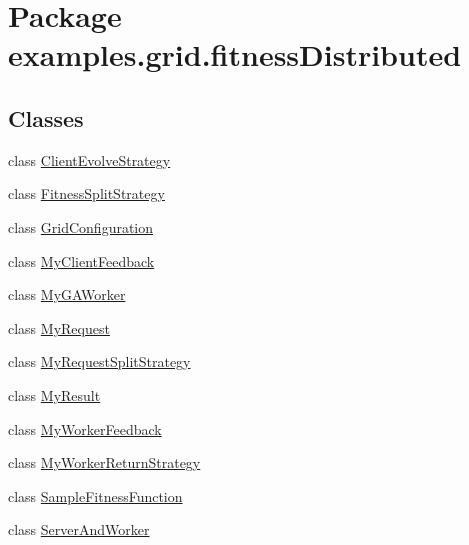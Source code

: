 \hypertarget{namespaceexamples_1_1grid_1_1fitness_distributed}{\section{Package examples.\-grid.\-fitness\-Distributed}
\label{namespaceexamples_1_1grid_1_1fitness_distributed}
}
\subsection*{Classes}
\begin{DoxyCompactItemize}
\item 
class \hyperlink{classexamples_1_1grid_1_1fitness_distributed_1_1_client_evolve_strategy}{Client\-Evolve\-Strategy}
\item 
class \hyperlink{classexamples_1_1grid_1_1fitness_distributed_1_1_fitness_split_strategy}{Fitness\-Split\-Strategy}
\item 
class \hyperlink{classexamples_1_1grid_1_1fitness_distributed_1_1_grid_configuration}{Grid\-Configuration}
\item 
class \hyperlink{classexamples_1_1grid_1_1fitness_distributed_1_1_my_client_feedback}{My\-Client\-Feedback}
\item 
class \hyperlink{classexamples_1_1grid_1_1fitness_distributed_1_1_my_g_a_worker}{My\-G\-A\-Worker}
\item 
class \hyperlink{classexamples_1_1grid_1_1fitness_distributed_1_1_my_request}{My\-Request}
\item 
class \hyperlink{classexamples_1_1grid_1_1fitness_distributed_1_1_my_request_split_strategy}{My\-Request\-Split\-Strategy}
\item 
class \hyperlink{classexamples_1_1grid_1_1fitness_distributed_1_1_my_result}{My\-Result}
\item 
class \hyperlink{classexamples_1_1grid_1_1fitness_distributed_1_1_my_worker_feedback}{My\-Worker\-Feedback}
\item 
class \hyperlink{classexamples_1_1grid_1_1fitness_distributed_1_1_my_worker_return_strategy}{My\-Worker\-Return\-Strategy}
\item 
class \hyperlink{classexamples_1_1grid_1_1fitness_distributed_1_1_sample_fitness_function}{Sample\-Fitness\-Function}
\item 
class \hyperlink{classexamples_1_1grid_1_1fitness_distributed_1_1_server_and_worker}{Server\-And\-Worker}
\end{DoxyCompactItemize}
